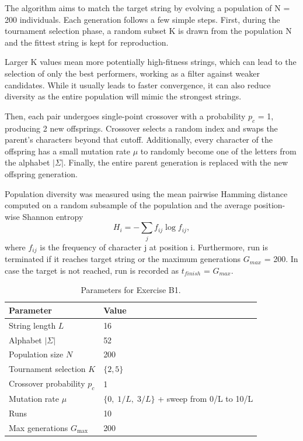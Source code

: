 \documentclass{article}
\begin{document}
The algorithm aims to match the target string by evolving a population of N = 200 individuals. 
Each generation follows a few simple steps. First, during the tournament selection phase, a random subset K is drawn from the population N and the fittest string is kept for reproduction. 

Larger K values mean more potentially high-fitness strings, which can lead to the selection of only the best performers, working as a filter against weaker candidates. While it usually leads to faster convergence, it can also reduce diversity as the entire population will mimic the strongest strings. 

Then, each pair undergoes single-point crossover with a probability $p_c$ = 1, producing 2 new offsprings. Crossover selects a random index and swaps the parent's characters beyond that cutoff. Additionally, every character of the offspring has a small mutation rate $\mu$ to randomly become one of the letters from the alphabet $|\Sigma|$.
Finally, the entire parent generation is replaced with the new offspring generation.

Population diversity was measured using the mean pairwise Hamming distance computed on a random subsample of the population and the average position-wise Shannon entropy \[H_i = -\sum_j f_{ij} \log f_{ij},\] where $f_{ij}$ is the frequency of character j at position i.
Furthermore, run is terminated if it reaches target string or the maximum generations $G_{max}$ = 200. In case the target is not reached, run is recorded as $t_{finish}$ = $G_{max}$.


\begin{table}[H]
\centering
\begin{tabular}{ll}
\hline
\textbf{Parameter} & \textbf{Value} \\
\hline
String length $L$ & 16 \\ %
Alphabet $|\Sigma|$ & 52 \\
Population size $N$ & 200 \\
Tournament selection $K$ & $\{2, 5\}$ \\
Crossover probability $p_c$ & 1 \\
Mutation rate $\mu$ & $\{0,\; 1/L,\; 3/L\}$ + sweep from 0/L to 10/L \\
Runs & 10 \\
Max generations $G_{\max}$ & 200 \\
\hline
\end{tabular}
\caption{Parameters for Exercise B1.}
\end{table}
\end{document}
